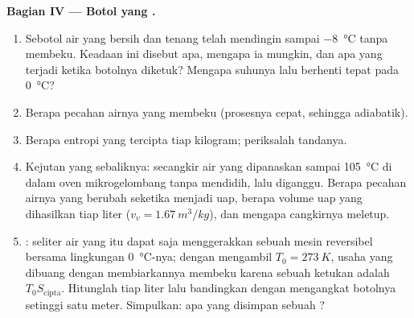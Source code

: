 \begin{problem}
\medskip
\noindent\textbf{Bagian IV --- Botol yang .}
\begin{enumerate}[resume]
  \item Sebotol air yang bersih dan tenang telah mendingin sampai \qty{-8}{\degreeCelsius}
        tanpa membeku. Keadaan ini disebut apa, mengapa ia mungkin,
        dan apa yang terjadi ketika botolnya diketuk? Mengapa suhunya
        lalu berhenti tepat pada \qty{0}{\degreeCelsius}?
  \item Berapa pecahan airnya yang membeku (prosesnya cepat, sehingga
        adiabatik).
  \item Berapa entropi yang tercipta tiap kilogram; periksalah tandanya.
  \item Kejutan yang sebaliknya: secangkir air yang dipanaskan sampai \qty{105}{\degreeCelsius}
        di dalam oven mikrogelombang tanpa mendidih, lalu diganggu. Berapa pecahan
        airnya yang berubah seketika menjadi uap, berapa volume uap yang dihasilkan tiap
        liter ($v_v = \qty{1.67}{m^3/kg}$), dan mengapa cangkirnya meletup.
  \item {}: seliter air yang  itu dapat saja menggerakkan sebuah mesin
        reversibel bersama lingkungan \qty{0}{\degreeCelsius}-nya; dengan mengambil
        $T_0 = \qty{273}{K}$, usaha yang dibuang dengan membiarkannya membeku karena
        sebuah ketukan adalah $T_0S_{\mathrm{cipta}}$. Hitunglah tiap liter lalu
        bandingkan dengan mengangkat botolnya setinggi satu meter. Simpulkan: apa yang
        disimpan sebuah ?
\end{enumerate}
\end{problem}
